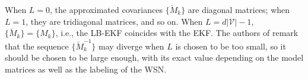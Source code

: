 \documentclass[twocolumn]{article}
\theoremstyle{plain}
\theoremstyle{definition}
\theoremstyle{definition}
\theoremstyle{remark}
\begin{document}
When $L=0$, the approximated covariances $\lbrace \breve M_k \rbrace$ are diagonal matrices; when $L=1$, they are tridiagonal matrices, and so on. When $L=d|\mathcal V| - 1$, $\lbrace \breve M_k \rbrace = \lbrace M_k \rbrace$, i.e., the LB-EKF coincides with the EKF.
The authors of \cite{moura2008distributing} remark that the sequence $\lbrace \breve M^{-1}_k \rbrace$ may diverge when $L$ is chosen to be too small, so it should be chosen to be large enough, with its exact value depending on the model matrices as well as the labeling of the WSN.
\end{document}
